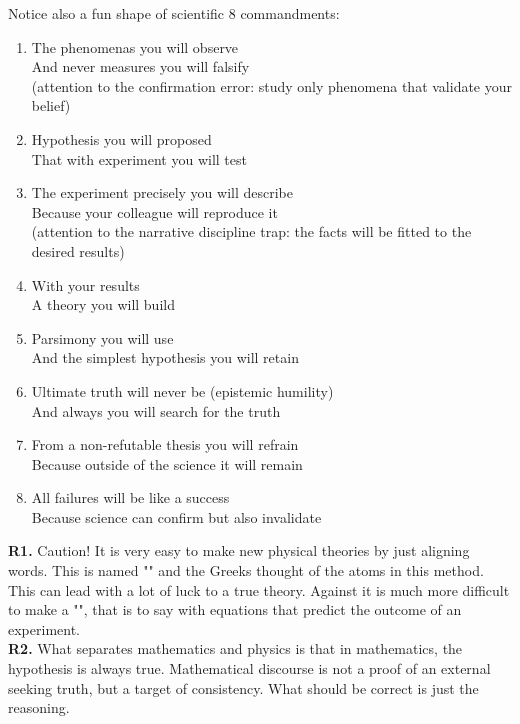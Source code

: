 Notice also a fun shape of scientific $8$ commandments:
\begin{enumerate}
\item The phenomenas you will observe\\
And never measures you will falsify\\
(attention to the confirmation error: study only phenomena that validate your belief)

\item Hypothesis you will proposed\\
That with experiment you will test

\item The experiment precisely you will describe\\
Because your colleague will reproduce it\\
(attention to the narrative discipline trap: the facts will be fitted to the desired results)

\item With your results\\
A theory you will build

\item Parsimony you will use\\
And the simplest hypothesis you will retain

\item Ultimate truth will never be (epistemic humility)\\
And always you will search for the truth

\item From a non-refutable thesis you will refrain\\
Because outside of the science it will remain

\item All failures will be like a success\\
Because science can confirm but also invalidate
\end{enumerate}

	\begin{tcolorbox}[title=Remarks,colframe=black,arc=10pt]
\textbf{R1.} Caution! It is very easy to make new physical theories by just aligning words. This is named "" and the Greeks thought of the atoms in this method. This can lead with a lot of luck to a true theory. Against it is much more difficult to make a "", that is to say with equations that predict the outcome of an experiment.\\

\textbf{R2.} What separates mathematics and physics is that in mathematics, the hypothesis is always true. Mathematical discourse is not a proof of an external seeking truth, but a target of consistency. What should be correct is just the reasoning. 
	\end{tcolorbox}

